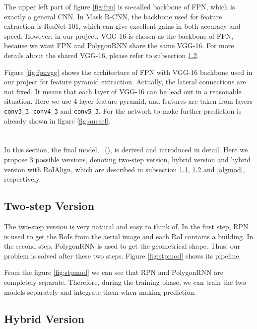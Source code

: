 The upper left part of figure \ref{fig:fpn} is so-called backbone of FPN, which is exactly a general CNN. In Mask R-CNN, the backbone used for feature extraction is ResNet-101, which can give excellent gains in both accuracy and speed. However, in our project, VGG-16 is chosen as the backbone of FPN, because we want FPN and PolygonRNN share the same VGG-16. For more details about the shared VGG-16, please refer to subsection \ref{hybmod}.

Figure \ref{fig:fpnvgg} shows the architecture of FPN with VGG-16 backbone used in our project for feature pyramid extraction. Actually, the lateral connections are not fixed. It means that each layer of VGG-16 can be lead out in a reasonable situation. Here we use 4-layer feature pyramid, and features are taken from layers \lstinline{conv3_3}, \lstinline{conv4_3} and \lstinline{conv5_3}. For the network to make further prediction is already shown in figure \ref{fig:ancsel}.



\section{\modelnameshort}\label{modmer}

In this section, the final model, \modelnameshort\ (\modelnamelong), is derived and introduced in detail. Here we propose 3 possible versions, denoting two-step version, hybrid version and hybrid version with RoIAlign, which are described in subsection \ref{stpmod}, \ref{hybmod} and \ref{algmod}, respectively.

\subsection{Two-step Version}\label{stpmod}

The two-step version is very natural and easy to think of. In the first step, RPN is used to get the RoIs from the aerial image and each RoI contains a building. In the second step, PolygonRNN is used to get the geometrical shape. Thus, our problem is solved after these two steps. Figure \ref{fig:stpmod} shows its pipeline.



From the figure \ref{fig:stpmod} we can see that RPN and PolygonRNN are completely separate. Therefore, during the training phase, we can train the two models separately and integrate them when making prediction.

\subsection{Hybrid Version}\label{hybmod}


